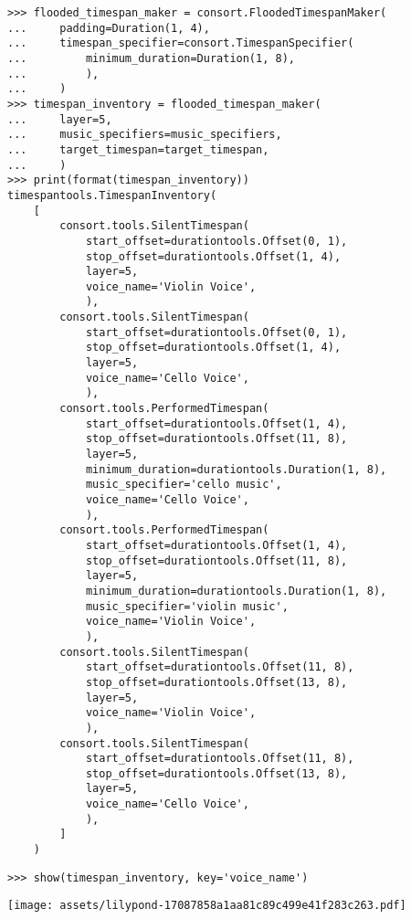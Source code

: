 \begin{abjadbookoutput}
\begin{singlespacing}
\vspace{-0.5\baselineskip}
\begin{verbatim}
>>> flooded_timespan_maker = consort.FloodedTimespanMaker(
...     padding=Duration(1, 4),
...     timespan_specifier=consort.TimespanSpecifier(
...         minimum_duration=Duration(1, 8),
...         ),
...     )
>>> timespan_inventory = flooded_timespan_maker(
...     layer=5,
...     music_specifiers=music_specifiers,
...     target_timespan=target_timespan,
...     )
>>> print(format(timespan_inventory))
timespantools.TimespanInventory(
    [
        consort.tools.SilentTimespan(
            start_offset=durationtools.Offset(0, 1),
            stop_offset=durationtools.Offset(1, 4),
            layer=5,
            voice_name='Violin Voice',
            ),
        consort.tools.SilentTimespan(
            start_offset=durationtools.Offset(0, 1),
            stop_offset=durationtools.Offset(1, 4),
            layer=5,
            voice_name='Cello Voice',
            ),
        consort.tools.PerformedTimespan(
            start_offset=durationtools.Offset(1, 4),
            stop_offset=durationtools.Offset(11, 8),
            layer=5,
            minimum_duration=durationtools.Duration(1, 8),
            music_specifier='cello music',
            voice_name='Cello Voice',
            ),
        consort.tools.PerformedTimespan(
            start_offset=durationtools.Offset(1, 4),
            stop_offset=durationtools.Offset(11, 8),
            layer=5,
            minimum_duration=durationtools.Duration(1, 8),
            music_specifier='violin music',
            voice_name='Violin Voice',
            ),
        consort.tools.SilentTimespan(
            start_offset=durationtools.Offset(11, 8),
            stop_offset=durationtools.Offset(13, 8),
            layer=5,
            voice_name='Violin Voice',
            ),
        consort.tools.SilentTimespan(
            start_offset=durationtools.Offset(11, 8),
            stop_offset=durationtools.Offset(13, 8),
            layer=5,
            voice_name='Cello Voice',
            ),
        ]
    )
\end{verbatim}
\begin{verbatim}
>>> show(timespan_inventory, key='voice_name')
\end{verbatim}
\noindent\texttt{[image: assets/lilypond-17087858a1aa81c89c499e41f283c263.pdf]}
\end{singlespacing}
\end{abjadbookoutput}

